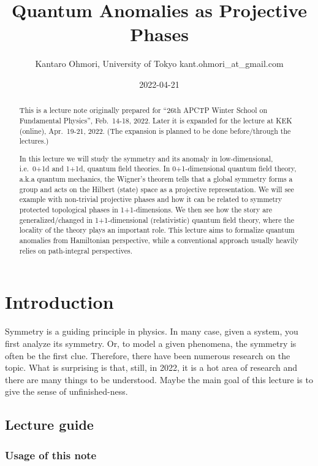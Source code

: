 \documentclass[
]{scrartcl}
\title{Quantum Anomalies as Projective Phases}
\author{Kantaro Ohmori, University of Tokyo kant.ohmori\_at\_gmail.com}
\date{2022-04-21}
\numberwithin{equation}{section}
\theoremstyle{definition}
\theoremstyle{definition}
\theoremstyle{definition}
\theoremstyle{definition}
\theoremstyle{remark}
\begin{document}
\maketitle
\begin{abstract}
This is a lecture note originally prepared for ``26th APCTP Winter School on Fundamental Physics'', Feb.~14-18, 2022.
Later it is expanded for the lecture at KEK (online), Apr.~19-21, 2022.
(The expansion is planned to be done before/through the lectures.)

In this lecture we will study the symmetry and its anomaly in low-dimensional, i.e.~0+1d and 1+1d, quantum field theories.
In 0+1-dimensional quantum field theory, a.k.a quantum mechanics, the Wigner's theorem tells that a global symmetry forms a group and acts on the Hilbert (state) space as a projective representation. We will see example with non-trivial projective phases and how it can be related to symmetry protected topological phases in 1+1-dimensions. We then see how the story are generalized/changed in 1+1-dimensional (relativistic) quantum field theory, where the locality of the theory plays an important role.
This lecture aims to formalize quantum anomalies from Hamiltonian perspective, while a conventional approach usually heavily relies on path-integral perspectives.
\end{abstract}

{
\setcounter{tocdepth}{2}
\tableofcontents
}
\hypertarget{introduction}{%
\section{Introduction}\label{introduction}}

Symmetry is a guiding principle in physics. In many case, given a system, you first analyze its symmetry. Or, to model a given phenomena, the symmetry is often be the first clue.
Therefore, there have been numerous research on the topic. What is surprising is that, still, in 2022, it is a hot area of research and there are many things to be understood.
Maybe the main goal of this lecture is to give the sense of unfinished-ness.

\hypertarget{lecture-guide}{%
\subsection{Lecture guide}\label{lecture-guide}}

\hypertarget{usage-of-this-note}{%
\subsubsection{Usage of this note}\label{usage-of-this-note}}
\end{document}
